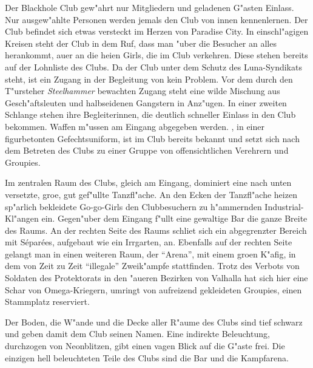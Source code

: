 
Der Blackhole Club gew"ahrt nur Mitgliedern und geladenen G"asten Einlass. Nur ausgew"ahlte Personen werden jemals den Club von innen kennenlernen. Der Club befindet sich etwas versteckt im Herzen von Paradise City. In einschl"agigen Kreisen steht der Club in dem Ruf, dass man "uber die Besucher an alles herankommt, au\3er an die hei\3en Girls, die im Club verkehren. Diese stehen bereits auf der Lohnliste des Clubs. Da der Club unter dem Schutz des Luna-Syndikats steht, ist ein Zugang in der Begleitung von \xl{} kein Problem. Vor dem durch den T"ursteher \emph{Steelhammer} bewachten Zugang steht eine wilde Mischung aus Gesch"aftsleuten und halbseidenen Gangstern in Anz"ugen. In einer zweiten Schlange stehen ihre Begleiterinnen, die deutlich schneller Einlass in den Club bekommen. Waffen m"ussen am Eingang abgegeben werden. \xl{}, in einer figurbetonten Gefechtsuniform, ist im Club bereits bekannt und setzt sich nach dem Betreten des Clubs zu einer Gruppe von offensichtlichen Verehrern und Groupies.

Im zentralen Raum des Clubs, gleich am Eingang, dominiert eine nach unten versetzte, gro\3e, gut gef"ullte Tanzfl"ache. An den Ecken der Tanzfl"ache heizen sp"arlich bekleidete Go-go-Girls den Clubbesuchern zu h"ammernden Industrial-Kl"angen ein. Gegen"uber dem Eingang f"ullt eine gewaltige Bar die ganze Breite des Raums. An der rechten Seite des Raums schlie\3t sich ein abgegrenzter Bereich mit S\'epar\'ees, aufgebaut wie ein Irrgarten, an. Ebenfalls auf der rechten Seite gelangt man in einen weiteren Raum, der ``Arena'', mit einem gro\3en K"afig, in dem von Zeit zu Zeit ``illegale'' Zweik"ampfe stattfinden. Trotz des Verbots von Soldaten des Protektorats in den "au\3eren Bezirken von Valhalla hat sich hier eine Schar von Omega-Kriegern, umringt von aufreizend gekleideten Groupies, einen Stammplatz reserviert. 

Der Boden, die W"ande und die Decke aller R"aume des Clubs sind tief schwarz und geben damit dem Club seinen Namen. Eine indirekte Beleuchtung, durchzogen von Neonblitzen, gibt einen vagen Blick auf die G"aste frei. Die einzigen hell beleuchteten Teile des Clubs sind die Bar und die Kampfarena.



